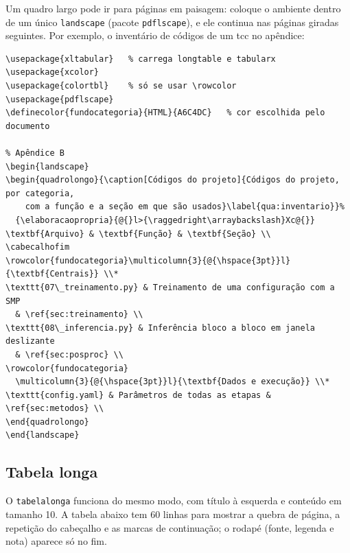 Um quadro largo pode ir para páginas em paisagem: coloque o ambiente
dentro de um único \texttt{landscape} (pacote \texttt{pdflscape}), e ele continua nas
páginas giradas seguintes. Por exemplo, o inventário de códigos de um \ac{tcc} no apêndice:
\begin{lstlisting}[style=exemplo, language={[LaTeX]TeX}]
% preâmbulo
\usepackage{xltabular}   % carrega longtable e tabularx
\usepackage{xcolor}
\usepackage{colortbl}    % só se usar \rowcolor
\usepackage{pdflscape}
\definecolor{fundocategoria}{HTML}{A6C4DC}   % cor escolhida pelo documento

% Apêndice B
\begin{landscape}
\begin{quadrolongo}{\caption[Códigos do projeto]{Códigos do projeto, por categoria,
    com a função e a seção em que são usados}\label{qua:inventario}}%
  {\elaboracaopropria}{@{}l>{\raggedright\arraybackslash}Xc@{}}
\textbf{Arquivo} & \textbf{Função} & \textbf{Seção} \\
\cabecalhofim
\rowcolor{fundocategoria}\multicolumn{3}{@{\hspace{3pt}}l}{\textbf{Centrais}} \\*
\texttt{07\_treinamento.py} & Treinamento de uma configuração com a SMP
  & \ref{sec:treinamento} \\
\texttt{08\_inferencia.py} & Inferência bloco a bloco em janela deslizante
  & \ref{sec:posproc} \\
\rowcolor{fundocategoria}
  \multicolumn{3}{@{\hspace{3pt}}l}{\textbf{Dados e execução}} \\*
\texttt{config.yaml} & Parâmetros de todas as etapas & \ref{sec:metodos} \\
\end{quadrolongo}
\end{landscape}
\end{lstlisting}

\subsection{Tabela longa}

O \texttt{tabelalonga} funciona do mesmo modo, com título à
esquerda e conteúdo em tamanho 10. A tabela abaixo tem 60 linhas para mostrar a quebra de
página, a repetição do cabeçalho e as marcas de continuação; o rodapé (fonte, legenda e
nota) aparece só no fim.


